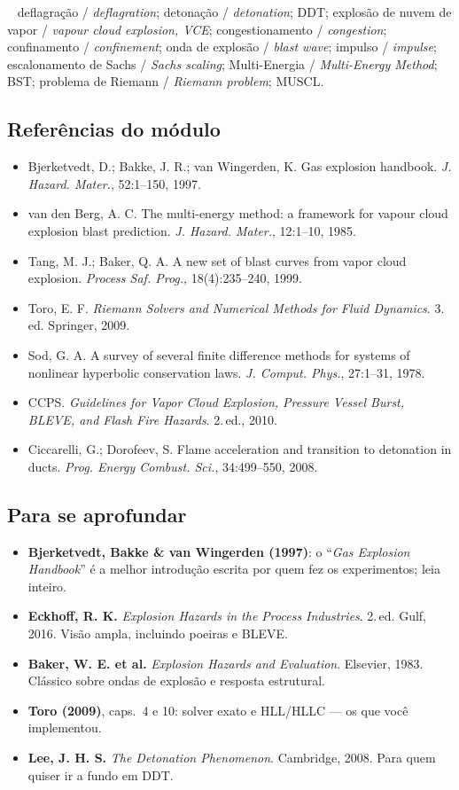 \documentclass[10pt,a4paper,twocolumn,openany]{report}
\newcommand{\lead}[2]{\par\medskip\noindent{\color{#1}\bfseries #2}\ }
\newenvironment{chaves}{\lead{cinza}{Palavras-chave (PT/EN):}\small}{\par}
\newenvironment{refs}{\subsection*{Referências do módulo}\small}{\par}
\newenvironment{aprofundar}{\subsection*{\textcolor{amarelo}{Para se aprofundar}}\small}{\par}
\begin{document}
\begin{chaves}
deflagração / \emph{deflagration}; detonação / \emph{detonation}; DDT;
explosão de nuvem de vapor / \emph{vapour cloud explosion, VCE};
congestionamento / \emph{congestion}; confinamento / \emph{confinement};
onda de explosão / \emph{blast wave}; impulso / \emph{impulse};
escalonamento de Sachs / \emph{Sachs scaling}; Multi-Energia / \emph{Multi-Energy
Method}; BST; problema de Riemann / \emph{Riemann problem}; MUSCL.
\end{chaves}

\begin{refs}
\begin{itemize}
  \item Bjerketvedt, D.; Bakke, J. R.; van Wingerden, K. Gas explosion handbook. \emph{J. Hazard. Mater.}, 52:1--150, 1997.
  \item van den Berg, A. C. The multi-energy method: a framework for vapour cloud explosion blast prediction. \emph{J. Hazard. Mater.}, 12:1--10, 1985.
  \item Tang, M. J.; Baker, Q. A. A new set of blast curves from vapor cloud explosion. \emph{Process Saf. Prog.}, 18(4):235--240, 1999.
  \item Toro, E. F. \emph{Riemann Solvers and Numerical Methods for Fluid Dynamics}. 3.\,ed. Springer, 2009.
  \item Sod, G. A. A survey of several finite difference methods for systems of nonlinear hyperbolic conservation laws. \emph{J. Comput. Phys.}, 27:1--31, 1978.
  \item CCPS. \emph{Guidelines for Vapor Cloud Explosion, Pressure Vessel Burst, BLEVE, and Flash Fire Hazards}. 2.\,ed., 2010.
  \item Ciccarelli, G.; Dorofeev, S. Flame acceleration and transition to detonation in ducts. \emph{Prog. Energy Combust. Sci.}, 34:499--550, 2008.
\end{itemize}
\end{refs}

\begin{aprofundar}
\begin{itemize}[leftmargin=*]
  \item \textbf{Bjerketvedt, Bakke \& van Wingerden (1997)}: o ``\emph{Gas Explosion Handbook}'' é a melhor introdução escrita por quem fez os experimentos; leia inteiro.
  \item \textbf{Eckhoff, R. K.} \emph{Explosion Hazards in the Process Industries}. 2.\,ed. Gulf, 2016. Visão ampla, incluindo poeiras e BLEVE.
  \item \textbf{Baker, W. E. et al.} \emph{Explosion Hazards and Evaluation}. Elsevier, 1983. Clássico sobre ondas de explosão e resposta estrutural.
  \item \textbf{Toro (2009)}, caps.\ 4 e 10: solver exato e HLL/HLLC --- os que você implementou.
  \item \textbf{Lee, J. H. S.} \emph{The Detonation Phenomenon}. Cambridge, 2008. Para quem quiser ir a fundo em DDT.
\end{itemize}
\end{aprofundar}
\end{document}

